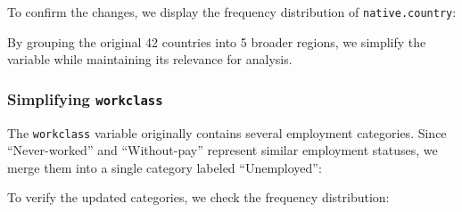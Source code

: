 \documentclass[
  11pt,
]{book}
\makeatletter
\newenvironment{Shaded}{}{}
\newcommand{\DecValTok}[1]{#1}
\newcommand{\FunctionTok}[1]{#1}
\newcommand{\NormalTok}[1]{#1}
\newcommand{\OtherTok}[1]{\textcolor[rgb]{0.39,0.39,0.39}{#1}}
\newcommand{\SpecialCharTok}[1]{\textcolor[rgb]{0.39,0.39,0.39}{#1}}
\newcommand{\StringTok}[1]{\textcolor[rgb]{0.39,0.39,0.39}{#1}}
\newenvironment{kframe}{%
\medskip{}
\setlength{\fboxsep}{.8em}
 \def\at@end@of@kframe{}%
 \ifinner\ifhmode%
  \def\at@end@of@kframe{\end{minipage}}%
  \begin{minipage}{\columnwidth}%
 \fi\fi%
 \def\FrameCommand##1{\hskip\@totalleftmargin \hskip-\fboxsep
 \colorbox{shadecolor}{##1}\hskip-\fboxsep
     \hskip-\linewidth \hskip-\@totalleftmargin \hskip\columnwidth}%
 \MakeFramed {\advance\hsize-\width
   \@totalleftmargin\z@ \linewidth\hsize
   \@setminipage}}%
 {\par\unskip\endMakeFramed%
 \at@end@of@kframe}
\renewenvironment{Shaded}{\begin{kframe}}{\end{kframe}}
\theoremstyle{definition}
\theoremstyle{definition}
\theoremstyle{definition}
\theoremstyle{definition}
\theoremstyle{remark}
\makeatother
\begin{document}
To confirm the changes, we display the frequency distribution of \texttt{native.country}:

\begin{Shaded}
\end{Shaded}

By grouping the original 42 countries into 5 broader regions, we simplify the variable while maintaining its relevance for analysis.

\subsubsection*{\texorpdfstring{Simplifying \texttt{workclass}}{Simplifying workclass}}\label{simplifying-workclass}


The \texttt{workclass} variable originally contains several employment categories. Since ``Never-worked'' and ``Without-pay'' represent similar employment statuses, we merge them into a single category labeled ``Unemployed'':

\begin{Shaded}
\end{Shaded}

To verify the updated categories, we check the frequency distribution:

\begin{Shaded}
\end{Shaded}
\end{document}
